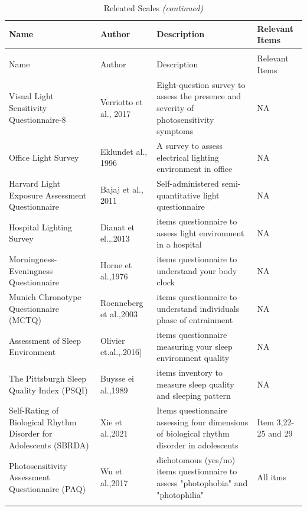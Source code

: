 \documentclass[
  english,
  man]{apa6}
\begin{document}
\begin{longtable}[t]{>{\raggedright\arraybackslash}p{4cm}>{\raggedright\arraybackslash}p{4cm}>{\raggedright\arraybackslash}p{4cm}>{\raggedright\arraybackslash}p{4cm}}
\caption{\label{tab:unnamed-chunk-2}Releated Scales}\\
\toprule
Name & Author & Description & Relevant Items\\
\midrule
\endfirsthead
\caption[]{\label{tab:unnamed-chunk-2}Releated Scales \textit{(continued)}}\\
\toprule
Name & Author & Description & Relevant Items\\
\midrule
\endhead

\endfoot
\bottomrule
\endlastfoot
Visual Light Sensitivity Questionnaire-8 & Verriotto et al., 2017 & Eight-question survey to assess the presence and severity of photosensitivity symptoms & NA\\
Office Light Survey & Eklundet al., 1996 & A survey to assess electrical lighting environment in office & NA\\
Harvard Light Exposure Assessment Questionnaire & Bajaj et al., 2011 & Self-administered semi-quantitative light questionnaire & NA\\
Hospital Lighting Survey & Dianat et el.,.2013 & 23 items questionnaire to assess light environment in a hospital & NA\\
Morningness-Eveningness Questionnaire & Horne et al.,1976 & 19 items questionnaire to understand your body clock & NA\\
\addlinespace
Munich Chronotype Questionnaire (MCTQ) & Roenneberg et al.,2003 & 17 items questionnaire to understand individuals phase of entrainment & NA\\
Assessment of Sleep Environment & Olivier et.al.,.2016] & 13 items questionnaire measuring your sleep environment quality & NA\\
The Pittsburgh Sleep Quality Index (PSQI) & Buysse ei al.,1989 & 9 items inventory to measure sleep quality and sleeping pattern & NA\\
Self-Rating of Biological Rhythm Disorder for Adolescents (SBRDA) & Xie et al.,2021 & 29 Items questionnaire assessing four dimensions of biological rhythm disorder in adolescents & Item 3,22-25 and 29\\
Photosensitivity Assessment Questionnaire (PAQ) & Wu et al.,2017 & 16 dichotomous (yes/no) items questionnaire to assess "photophobia" and "photophilia" & All itms\\*
\end{longtable}
\end{document}
